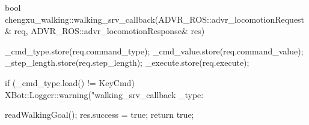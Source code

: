 {bool chengxu_walking::walking_srv_callback(ADVR_ROS::advr_locomotionRequest& req, ADVR_ROS::advr_locomotionResponse& res)
{
        _cmd_type.store(req.command_type);
        _cmd_value.store(req.command_value);
        _step_length.store(req.step_length);
        _execute.store(req.execute);

        if (_cmd_type.load() != KeyCmd) {
                XBot::Logger::warning("walking_srv_callback \ncmd_type: %
        }

        readWalkingGoal();
        res.success = true;
        return true;
}

}
